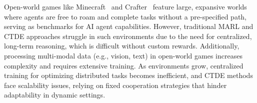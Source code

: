 
Open-world games like Minecraft~\cite{fan2022minedojo} and Crafter~\cite{hafner2021benchmarking} feature large, expansive worlds where agents are free to roam and complete tasks without a pre-specified path, serving as benchmarks for AI agent capabilities. However, traditional MARL and CTDE approaches struggle in such environments due to the need for centralized, long-term reasoning, which is difficult without custom rewards. Additionally, processing multi-modal data (e.g., vision, text) in open-world games increases complexity and requires extensive training. As environments grow, centralized training for optimizing distributed tasks becomes inefficient, and CTDE methods face scalability issues, relying on fixed cooperation strategies that hinder adaptability in dynamic settings.





